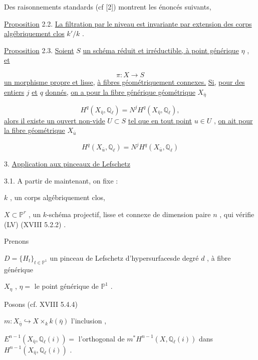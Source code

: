 Des raisonnements standards (cf [2]) montrent les énoncés suivants,

\underline{Proposition} 2.2.  \underline{La filtration par le niveau est invariante par extension des corps algébriquement clos}  $k'/k$  .

\underline{Proposition} 2.3.   \underline{Soient}  $S$  \underline{un schéma réduit et irréductible, à point générique}  $\eta$  , \underline{et}

\begin{equation*}
\pi : X \longrightarrow S
\end{equation*}
\underline{un morphisme propre et lisse,} \underline{à fibres géométriquement connexes.} \underline{Si,} \underline{pour des entiers}  $j$  \underline{et}  $q$  \underline{donnés,} \underline{on a pour la fibre générique géométrique}  $X_{\bar{\eta}}$

\begin{equation}\tag{2.3.1}
H^q(X_{\bar{\eta}}, \mathbb{Q}_\ell) = N^j H^q(X_{\bar{\eta}}, \mathbb{Q}_\ell) ,
\end{equation}
\underline{alors il existe un ouvert non-vide}  $U \subset S$  \underline{tel que en tout point}  $u \in U$  , \underline{on ait pour la fibre géométrique}  $X_{\bar{u}}$

\begin{equation}\tag{2.3.2}
H^q(X_{\bar{u}}, \mathbb{Q}_\ell) = N^j H^q(X_{\bar{u}}, \mathbb{Q}_\ell)
\end{equation}



3. \underline{Application aux pinceaux de Lefschetz}

3.1. \quad A partir de maintenant, on fixe :

$k$ , un corps algébriquement clos,

$X \subset \mathbb{P}^{r}$ , un $k$-schéma projectif, lisse et connexe de dimension paire $n$ , qui vérifie (LV) (XVIII 5.2.2) .

Prenons

$D = \{H_{t}\}_{t \in \mathbb{P}^{1}}$ un pinceau de Lefschetz d'hypersurfacesde degré $d$ , à fibre générique

$X_{\eta}$ , $\eta =$ le point générique de $\mathbb{P}^{1}$ .

Posons (cf. XVIII 5.4.4)

$m : X_{\bar{\eta}} \hookrightarrow X \times_{k} k(\bar{\eta})$ l'inclusion ,

$E^{n-1}(X_{\bar{\eta}}, \mathbb{Q}_{\ell}(i)) =$ l'orthogonal de $m^{*}H^{n-1}(X,\mathbb{Q}_{\ell}(i))$ dans $H^{n-1}(X_{\bar{\eta}},\mathbb{Q}_{\ell}(i))$ .

